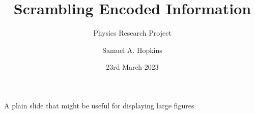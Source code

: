 \documentclass[aspectratio=169]{beamer}
\title[Quantum Scrambling]{Scrambling Encoded Information}
\subtitle{Physics Research Project}
\author{Samuel A. Hopkins}
\institute{Theoretical Physics MSci}
\date{23rd March 2023}
\begin{document}



\begin{frame}[leftcolor=CoolGrey,rightcolor=UniversityRed,div=0.8\paperwidth]
  \titlepage
\end{frame}



\begin{frame}[plain]
  A plain slide that might be useful for displaying large figures
\end{frame}
\end{document}
